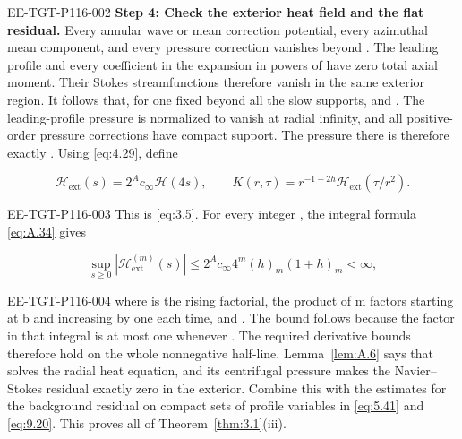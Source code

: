 \begin{EESegment}{EE-TGT-P116-002}
\noindent\textbf{Step 4: Check the exterior heat field and the flat residual.} Every annular wave
or mean correction potential, every azimuthal mean component, and every pressure correction
vanishes beyond . The leading profile and every coefficient in the
expansion in powers of  have zero total axial moment. Their Stokes
streamfunctions therefore vanish in the same exterior region. It follows that, for one fixed
 beyond all the slow supports,
 and . The leading-profile
pressure is normalized to vanish at radial infinity, and all positive-order pressure corrections
have compact support. The pressure there is therefore exactly
. Using \eqref{eq:4.29}, define
\end{EESegment}
\[
\mathcal H_{\mathrm{ext}}(s)=2^Ac_\infty\mathcal H(4s),
\qquad K(r,\tau)=r^{-1-2h}\mathcal H_{\mathrm{ext}}(\tau/r^2).
\]
\begin{EESegment}{EE-TGT-P116-003}
This is \eqref{eq:3.5}. For every integer , the integral formula
\eqref{eq:A.34} gives
\end{EESegment}
\[
\sup_{s\geq0}|\mathcal H_{\mathrm{ext}}^{(m)}(s)|
\leq2^Ac_\infty4^m(h)_m(1+h)_m<\infty,
\]
\begin{EESegment}{EE-TGT-P116-004}
where  is the rising factorial, the product of m factors starting
at b and increasing by one each time, and
. The bound follows because the factor
 in that integral is at most one whenever
. The required derivative bounds therefore hold on the whole
nonnegative half-line. Lemma~\ref{lem:A.6} says that  solves the radial
heat equation, and its centrifugal pressure makes the Navier--Stokes residual exactly zero in the
exterior. Combine this with the estimates for the background residual on compact sets of profile
variables in \eqref{eq:5.41} and \eqref{eq:9.20}. This proves all of
Theorem~\ref{thm:3.1}\textup{(iii)}.
\end{EESegment}

